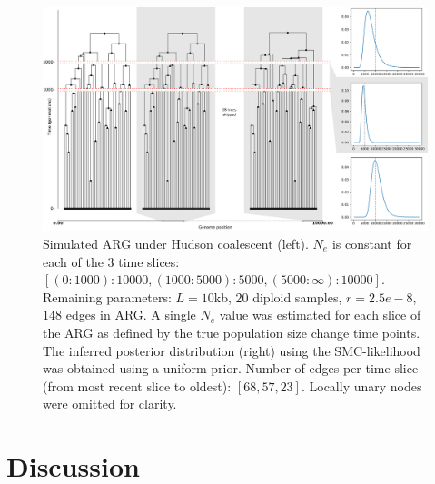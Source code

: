 \documentclass{article}
\begin{document}
\begin{figure}[!ht]
    \centering
    \includegraphics[width=\textwidth]{figures/3-slices-whitespace.png}
    \caption{Simulated ARG under Hudson coalescent (left). $N_e$ is constant
    for each of the 3 time slices: $[(0:1000): 10 000, (1000:5000): 5000,
    (5000:\infty):10 000]$. Remaining parameters: $L=10$kb, $20$ diploid samples,
    $r=2.5e-8$, $148$ edges in ARG. A single $N_e$ value was estimated for each
    slice of the ARG as defined by the true population size change time points.
    The inferred posterior distribution (right) using the SMC-likelihood was
    obtained using a uniform prior. Number of edges per time slice
    (from most recent slice to oldest): $[68, 57, 23]$. Locally unary nodes were
    omitted for clarity.}
    \label{fig:3-arg-slices}
\end{figure}


\section{Discussion}
\end{document}

